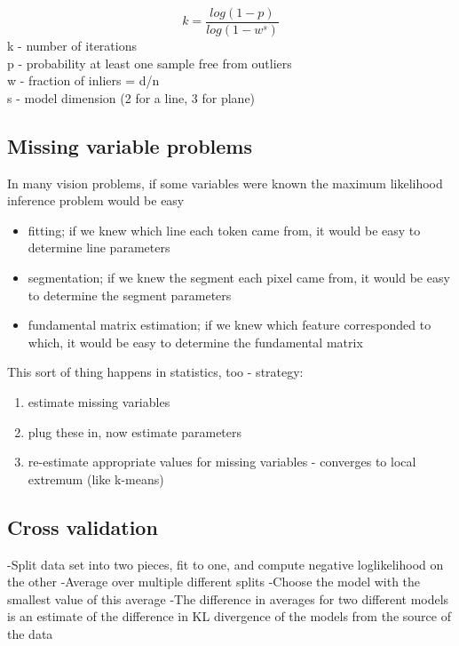 $$ k = \frac{log(1-p)}{log(1-w^s)} $$
k - number of iterations\\
p - probability at least one sample free from outliers\\
w - fraction of inliers = d/n\\
s - model dimension (2 for a line, 3 for plane)

\subsection{Missing variable problems}

In many vision problems, if some variables were known the maximum likelihood inference problem would be easy 
\begin{itemize}
	\item fitting; if we knew which line each token came from, it would be easy to determine line parameters
	\item segmentation; if we knew the segment each pixel came from, it would be easy to determine the segment parameters
	\item fundamental matrix estimation; if we knew which feature corresponded to which, it would be easy to determine the fundamental matrix
\end{itemize}
This sort of thing happens in statistics, too - strategy:
\begin{enumerate}
	\item estimate missing variables
	\item plug these in, now estimate parameters
	\item re-estimate appropriate values for missing variables - converges to local extremum (like k-means)
\end{enumerate}

\subsection{Cross validation}
-Split data set into two pieces, fit to one, and compute negative loglikelihood on the other
-Average over multiple different splits
-Choose the model with the smallest value of this average
-The difference in averages for two different models is an estimate of the difference in KL divergence of the models from the source of the data